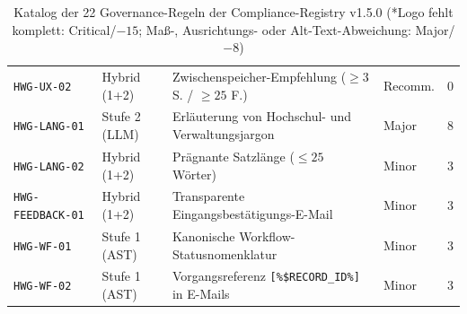 \begin{table}[htbp]
\begin{tabularx}{\textwidth}{ll>{\raggedright\arraybackslash}Xlc}
\texttt{HWG-UX-02}     & Hybrid (1+2)  & Zwischenspeicher-Empfehlung ($\ge 3$ S. / $\ge 25$ F.) & Recomm. & 0 \\
\texttt{HWG-LANG-01}   & Stufe 2 (LLM) & Erläuterung von Hochschul- und Verwaltungsjargon & Major & 8 \\
\texttt{HWG-LANG-02}   & Hybrid (1+2)  & Prägnante Satzlänge ($\le 25$ Wörter) & Minor & 3 \\
\texttt{HWG-FEEDBACK-01}& Hybrid (1+2) & Transparente Eingangsbestätigungs-E-Mail & Minor & 3 \\
\texttt{HWG-WF-01}     & Stufe 1 (AST) & Kanonische Workflow-Statusnomenklatur & Minor & 3 \\
\texttt{HWG-WF-02}     & Stufe 1 (AST) & Vorgangsreferenz \texttt{[\%\$RECORD\_ID\%]} in E-Mails & Minor & 3 \\
\bottomrule
\end{tabularx}
\caption{Katalog der 22 Governance-Regeln der Compliance-Registry v1.5.0 (*Logo fehlt komplett: Critical/$-15$; Maß-, Ausrichtungs- oder Alt-Text-Abweichung: Major/$-8$)}
\label{tab:rules_catalog}
\end{table}
